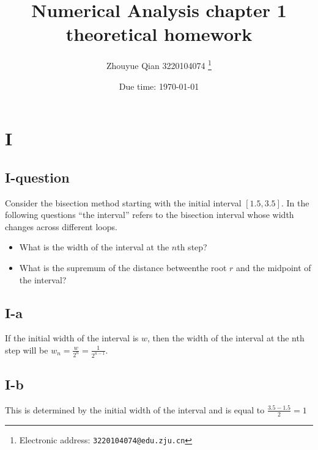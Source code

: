 \documentclass[a4paper]{article}
\begin{document}
\title{Numerical Analysis chapter 1 theoretical homework}

\author{Zhouyue Qian 3220104074
  \thanks{Electronic address: \texttt{3220104074@edu.zju.cn}}}


\date{Due time: \today}

\maketitle






\section*{I}
\subsection*{I-question}
Consider the bisection method starting with the initial interval $[1.5, 3.5]$. In the following questions “the
interval” refers to the bisection interval whose width
changes across different loops.
\begin{itemize}
    \item What is the width of the interval at the $n$th step?
    \item What is the supremum of the distance betweenthe root $r$ and the midpoint of the interval?
\end{itemize}
\subsection*{I-a}

If the initial width of the interval is $w$, then the width of the interval at the nth step will be $w_n = \frac{w}{2^n}=\frac{1}{2^{n-1}}$.

\subsection*{I-b}
This is determined by the initial width of the interval and is equal to $\frac{3.5-1.5}{2}=1$
\end{document}
